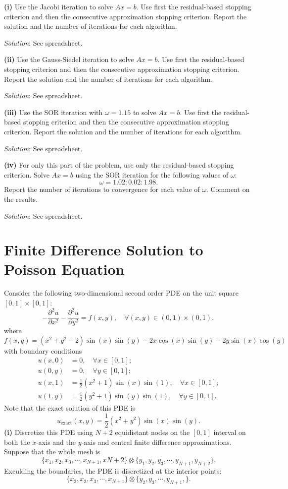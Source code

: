 \documentclass[paper=a4, fontsize=11pt]{scrartcl} %
\numberwithin{equation}{section} %
\numberwithin{figure}{section} %
\numberwithin{table}{section} %
\begin{document}
\textbf{(i)} Use the Jacobi iteration to solve $Ax = b$. Use first the residual-based stopping 
criterion and then the consecutive approximation stopping criterion. Report the solution
and the number of iterations for each algorithm.

\textit{Solution}: See spreadsheet.
\newline

\textbf{(ii)} Use the Gauss-Siedel iteration to solve $Ax = b$. Use first the residual-based
stopping criterion and then the consecutive approximation stopping criterion. Report
the solution and the number of iterations for each algorithm.

\textit{Solution}: See spreadsheet.
\newline

\textbf{(iii)} Use the SOR iteration with $\omega=1.15$ to solve $Ax = b$. Use first the residual-based
stopping criterion and then the consecutive approximation stopping criterion. Report
the solution and the number of iterations for each algorithm.

\textit{Solution}: See spreadsheet.
\newline

\textbf{(iv)} For only this part of the problem, use only the residual-based stopping criterion.
Solve $Ax = b$ using the SOR iteration for the following values of $\omega$:
$$\omega = 1.02 : 0.02 : 1.98.$$
Report the number of iterations to convergence for each value of $\omega$. Comment on the
results.

\textit{Solution}: See spreadsheet.

\newpage

\section{Finite Difference Solution to Poisson Equation}
Consider the following two-dimensional second order PDE on the unit square $[0,1]\times[0,1]$:
$$
-\frac{\partial^2 u}{\partial x^2} -\frac{\partial^2 u}{\partial y^2} = f(x,y),\quad \forall (x,y)\in (0,1)\times(0,1),
$$
where 
$$
f(x,y) = (x^2+y^2-2)\sin(x)\sin(y)-2x\cos(x)\sin(y)-2y\sin(x)\cos(y)
$$
with boundary conditions
\begin{align}
\nonumber u(x,0) &= 0, \quad \forall x\in [0,1];\\
\nonumber u(0,y) &= 0, \quad \forall y\in [0,1];\\
\nonumber u(x,1) &= \frac{1}{2}(x^2+1)\sin(x)\sin(1), \quad \forall x\in [0,1];\\
\nonumber u(1,y) &= \frac{1}{2}(y^2+1)\sin(y)\sin(1), \quad \forall y\in [0,1].
\end{align}
Note that the exact solution of this PDE is
$$
u_{\text{exact}}(x,y) = \frac{1}{2}(x^2+y^2)\sin(x)\sin(y).
$$
\textbf{(i)} Discretize this PDE using $N+2$ equidistant nodes on the $[0,1]$ interval on both the $x$-axis and the
$y$-axis and central finite difference approximations. Suppose that the whole mesh is
$$\{x_1 , x_2 , x_3 ,\cdots, x_{N+1} , x N +2 \} \otimes \{y_1 , y_2 , y_3 , \cdots , y_{N+1}, y_{N+2} \}.$$
Exculding the boundaries, the PDE is discretized at the interior points:
$$\{x_2 , x_2 , x_3 ,\cdots, x_{N+1} \} \otimes \{y_2 , y_3 , \cdots , y_{N+1},\}.$$
\end{document}
